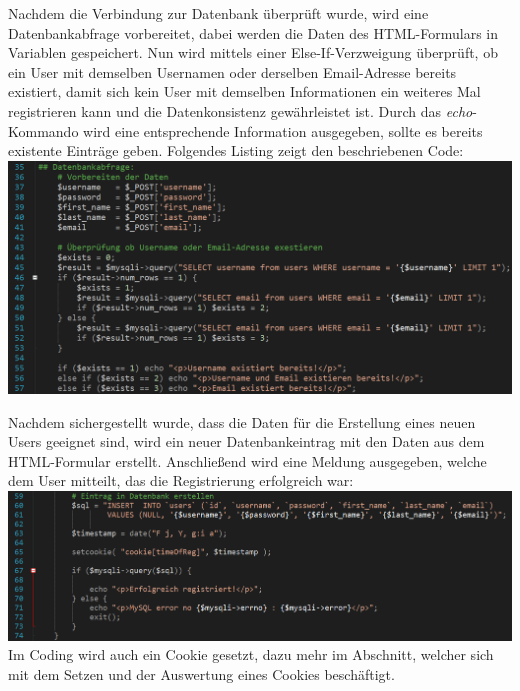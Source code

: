 Nachdem die Verbindung zur Datenbank \"uberpr\"uft wurde, wird eine Datenbankabfrage vorbereitet, dabei werden die Daten des HTML-Formulars in Variablen gespeichert. Nun wird mittels einer Else-If-Verzweigung \"uberpr\"uft, ob ein User mit demselben Usernamen oder derselben Email-Adresse bereits existiert, damit sich kein User mit demselben Informationen ein weiteres Mal registrieren kann und die Datenkonsistenz gew\"ahrleistet ist. Durch das \textit{echo}-Kommando wird eine entsprechende Information ausgegeben, sollte es bereits existente Eintr\"age geben. Folgendes Listing zeigt den beschriebenen Code:
\newline	
\includegraphics[width=1\textwidth]{img/vincent/abb13.png}
\newline

Nachdem sichergestellt wurde, dass die Daten f\"ur die Erstellung eines neuen Users geeignet sind, wird ein neuer Datenbankeintrag mit den Daten aus dem HTML-Formular erstellt. Anschlie{\ss}end wird eine Meldung ausgegeben, welche dem User mitteilt, das die Registrierung erfolgreich war:
\newline	
\includegraphics[width=1\textwidth]{img/vincent/abb14.png}
\newline
Im Coding wird auch ein Cookie gesetzt, dazu mehr im Abschnitt, welcher sich mit dem Setzen und der Auswertung eines Cookies besch\"aftigt.	

